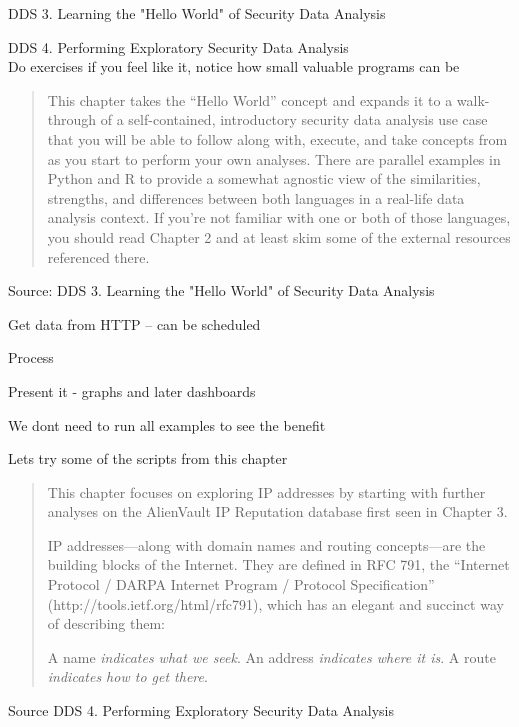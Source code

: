 \documentclass[Screen16to9,17pt]{foils}
\begin{document}
\begin{list1}
\item DDS 3. Learning the "Hello World" of Security Data Analysis
\item DDS 4. Performing Exploratory Security Data Analysis \\
Do exercises if you feel like it, notice how small valuable programs can be
\end{list1}




\begin{quote}
This chapter takes the “Hello World” concept and expands it to a walk-through of a self-contained, introductory security data analysis use case that you will be able to follow along with, execute, and take concepts from as you start to perform your own analyses. There are parallel examples in Python and R to provide a somewhat agnostic view of the similarities, strengths, and differences between both languages in a real-life data analysis context. If you’re not familiar with one or both of those languages, you should read Chapter 2 and at least skim some of the external resources referenced there.
\end{quote}
Source: DDS 3. Learning the "Hello World" of Security Data Analysis


\begin{list2}
\item Get data from HTTP -- can be scheduled
\item Process
\item Present it - graphs and later dashboards
\item We dont need to run all examples to see the benefit
\item Lets try some of the scripts from this chapter
\end{list2}




\begin{quote}
This chapter focuses on exploring IP addresses by starting with further analyses on the AlienVault IP Reputation database first seen in Chapter 3.

IP addresses—along with domain names and routing concepts—are the building blocks of the Internet. They are defined in RFC 791, the “Internet Protocol / DARPA Internet Program / Protocol Specification” (http://tools.ietf.org/html/rfc791), which has an elegant and succinct way of describing them:

\hskip 1cm A name \emph{indicates what we seek}. An address \emph{indicates where it is}. A route \emph{indicates how to get there}.

\end{quote}
Source DDS 4. Performing Exploratory Security Data Analysis
\end{document}
